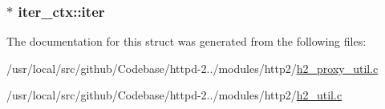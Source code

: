 \subsubsection[{\texorpdfstring{iter}{iter}}]{$\ast$ iter\+\_\+ctx\+::iter}\hypertarget{structiter__ctx_a2c0db4f484a7318e5b5278f3c2f46ac7}{}\label{structiter__ctx_a2c0db4f484a7318e5b5278f3c2f46ac7}


The documentation for this struct was generated from the following files\+:\begin{DoxyCompactItemize}
\item 
/usr/local/src/github/\+Codebase/httpd-\/2../modules/http2/\hyperlink{h2__proxy__util_8c}{h2\+\_\+proxy\+\_\+util.\+c}\item 
/usr/local/src/github/\+Codebase/httpd-\/2../modules/http2/\hyperlink{h2__util_8c}{h2\+\_\+util.\+c}\end{DoxyCompactItemize}
